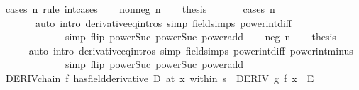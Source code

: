 \begin{isabellebody}
%
\isadelimproof
%
\endisadelimproof
%
\isatagproof
{}\isamarkupfalse%
\ {\isacharparenleft}{\kern0pt}cases\ n\ rule{\isacharcolon}{\kern0pt}\ int{\isacharunderscore}{\kern0pt}cases{}{\isacharparenright}{\kern0pt}\isanewline
\ \ \isamarkupfalse%
\ {\isacharparenleft}{\kern0pt}nonneg\ n{\isacharparenright}{\kern0pt}\isanewline
\ \ \isamarkupfalse%
\ {\isacharquery}{\kern0pt}thesis\ \isanewline
\ \ \ \ \isamarkupfalse%
\ {\isacharparenleft}{\kern0pt}cases\ {\isachardoublequoteopen}n\ {\isacharequal}{\kern0pt}\ {}{\isachardoublequoteclose}{\isacharparenright}{\kern0pt}\isanewline
\ \ \ \ \ \ \ {\isacharparenleft}{\kern0pt}auto\ intro{\isacharbang}{\kern0pt}{\isacharcolon}{\kern0pt}\ derivative{\isacharunderscore}{\kern0pt}eq{\isacharunderscore}{\kern0pt}intros\ simp{\isacharcolon}{\kern0pt}\ field{\isacharunderscore}{\kern0pt}simps\ power{\isacharunderscore}{\kern0pt}int{\isacharunderscore}{\kern0pt}diff\isanewline
\ \ \ \ \ \ \ \ \ \ \ \ \ simp\ flip{\isacharcolon}{\kern0pt}\ power{\isacharunderscore}{\kern0pt}Suc\ power{\isacharunderscore}{\kern0pt}Suc{}\ power{\isacharunderscore}{\kern0pt}add{\isacharparenright}{\kern0pt}\isanewline
{}\isamarkupfalse%
\isanewline
\ \ \isamarkupfalse%
\ {\isacharparenleft}{\kern0pt}neg\ n{\isacharparenright}{\kern0pt}\isanewline
\ \ \isamarkupfalse%
\ {\isacharquery}{\kern0pt}thesis\isanewline
\ \ \ \ \isamarkupfalse%
\ {\isacharparenleft}{\kern0pt}auto\ intro{\isacharbang}{\kern0pt}{\isacharcolon}{\kern0pt}\ derivative{\isacharunderscore}{\kern0pt}eq{\isacharunderscore}{\kern0pt}intros\ simp{\isacharcolon}{\kern0pt}\ field{\isacharunderscore}{\kern0pt}simps\ power{\isacharunderscore}{\kern0pt}int{\isacharunderscore}{\kern0pt}diff\ power{\isacharunderscore}{\kern0pt}int{\isacharunderscore}{\kern0pt}minus\isanewline
\ \ \ \ \ \ \ \ \ \ \ \ \ simp\ flip{\isacharcolon}{\kern0pt}\ power{\isacharunderscore}{\kern0pt}Suc\ power{\isacharunderscore}{\kern0pt}Suc{}\ power{\isacharunderscore}{\kern0pt}add{\isacharparenright}{\kern0pt}\isanewline
{}\isamarkupfalse%
%
\endisatagproof
{\isafoldproof}%
%
\isadelimproof
\isanewline
%
\endisadelimproof
\isanewline
{}\isamarkupfalse%
\ DERIV{\isacharunderscore}{\kern0pt}chain{\isacharprime}{\kern0pt}{\isacharcolon}{\kern0pt}\ {\isachardoublequoteopen}{\isacharparenleft}{\kern0pt}f\ has{\isacharunderscore}{\kern0pt}field{\isacharunderscore}{\kern0pt}derivative\ D{\isacharparenright}{\kern0pt}\ {\isacharparenleft}{\kern0pt}at\ x\ within\ s{\isacharparenright}{\kern0pt}\ {\isasymLongrightarrow}\ DERIV\ g\ {\isacharparenleft}{\kern0pt}f\ x{\isacharparenright}{\kern0pt}\ {\isacharcolon}{\kern0pt}{\isachargreater}{\kern0pt}\ E\ {\isasymLongrightarrow}\isanewline

\end{isabellebody}
